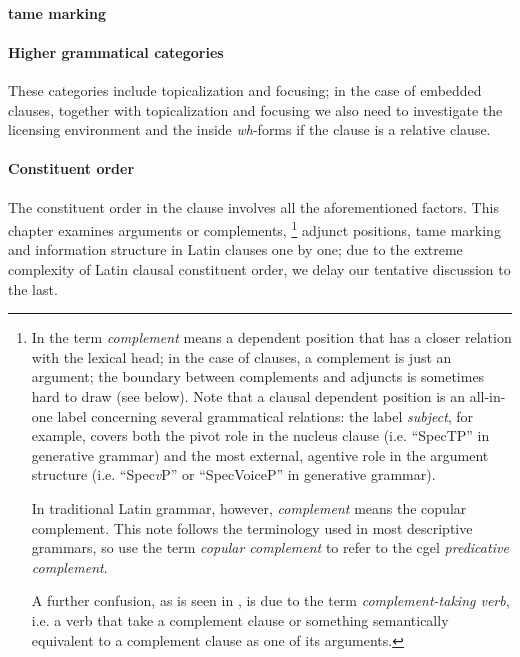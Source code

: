 \documentclass[a4paper, oneside, 12pt]{report}
\newcommand*{\term}[1]{\emph{#1}}
\newcommand{\form}[1]{\emph{#1}}
\newcommand{\vP}{\textit{v}P}
\begin{document}
\paragraph*{\ac{tame} marking} 

\paragraph*{Higher grammatical categories} These categories include topicalization and focusing;
in the case of embedded clauses, 
together with topicalization and focusing 
we also need to investigate the licensing environment
and the inside \form{wh}-forms if the clause is a relative clause.

\paragraph*{Constituent order} 
The constituent order in the clause involves all the aforementioned factors.
This chapter examines arguments or complements,
\footnote{
    In \citet{cgel} the term \term{complement} means a 
    dependent position that has a closer relation with the lexical head;
    in the case of clauses, a complement is just an argument;
    the boundary between complements and adjuncts is sometimes hard to draw (see below).    
    Note that a clausal dependent position is 
    an all-in-one label concerning several grammatical relations:
    the label \term{subject}, for example, 
    covers both the pivot role in the nucleus clause 
    (i.e. ``SpecTP'' in generative grammar) 
    and the most external, agentive role in the argument structure
    (i.e. ``Spec\vP'' or ``SpecVoiceP'' in generative grammar).

    In traditional Latin grammar, however, \term{complement} means the copular complement. 
    This note follows the terminology used in most descriptive grammars,
    so use the term \term{copular complement} to refer to the \ac{cgel} \term{predicative complement}.

    A further confusion, as is seen in , 
    is due to the term \term{complement-taking verb}, 
    i.e. a verb that take a complement clause 
    or something semantically equivalent to a complement clause
    as one of its arguments.
}
adjunct positions, \ac{tame} marking and information structure in Latin clauses one by one;
due to the extreme complexity of Latin clausal constituent order, 
we delay our tentative discussion to the last.
\end{document}
